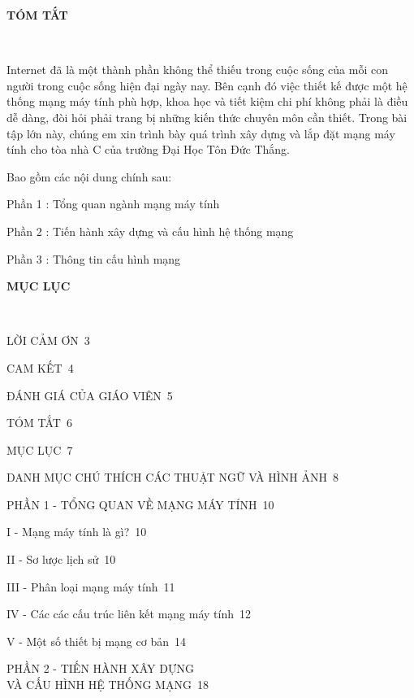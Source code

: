 \documentclass{report}
\begin{document}
\newpage
\changefontsizes{16pt}
\centerline{\textbf{TÓM TẮT}}\

\changefontsizes{13pt}
\setlength{\parindent}{2cm}
Internet đã là một thành phần không thể thiếu trong cuộc sống của mỗi con người trong cuộc sống hiện đại ngày nay. Bên cạnh đó việc thiết kế được một hệ thống mạng máy tính phù hợp, khoa học và tiết kiệm chi phí không phải là điều dễ dàng, đòi hỏi phải trang bị những kiến thức chuyên môn cần thiết. Trong bài tập lớn này, chúng em xin trình bày quá trình xây dựng và lắp đặt mạng máy tính cho tòa nhà C của trường Đại Học Tôn Đức Thắng.

\vspace{0.5cm}
\setlength{\parindent}{2cm}
Bao gồm các nội dung chính sau:

\setlength{\parindent}{3cm}
Phần 1 : Tổng quan ngành mạng máy tính

\setlength{\parindent}{3cm}
Phần 2 : Tiến hành xây dựng và cấu hình hệ thống mạng

\setlength{\parindent}{3cm}
Phần 3 : Thông tin cấu hình mạng


\newpage
\changefontsizes{16pt}
\centerline{\textbf{MỤC LỤC}}\

\vspace{1.2cm}
\changefontsizes{14pt}
\setlength{\parindent}{0cm}
LỜI CẢM ƠN\dotfill\ 3

\smallskip
CAM KẾT\dotfill\ 4

\smallskip
ĐÁNH GIÁ CỦA GIÁO VIÊN\dotfill\ 5

\smallskip
TÓM TẮT\dotfill\ 6

\smallskip
MỤC LỤC\dotfill\ 7

\smallskip
DANH MỤC CHÚ THÍCH CÁC THUẬT NGỮ VÀ HÌNH ẢNH\dotfill\ 8

\smallskip
PHẦN 1 - TỔNG QUAN VỀ MẠNG MÁY TÍNH\dotfill\ 10

\changefontsizes{14pt}
\setlength{\parindent}{2cm}
\smallskip
I - Mạng máy tính là gì?\dotfill\ 10

II - Sơ lược lịch sử\dotfill\ 10

III - Phân loại mạng máy tính\dotfill\ 11

IV - Các các cấu trúc liên kết mạng máy tính\dotfill\ 12

V - Một số thiết bị mạng cơ bản\dotfill\ 14

\changefontsizes{14pt}
\setlength{\parindent}{0cm}
\smallskip
PHẦN 2 - TIẾN HÀNH XÂY DỰNG\\ VÀ CẤU HÌNH HỆ THỐNG MẠNG\dotfill\ 18
\end{document}
